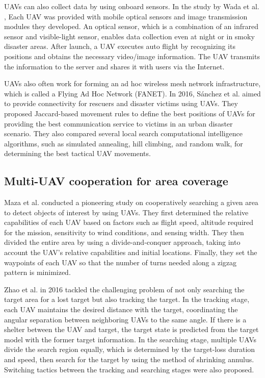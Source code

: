 \documentclass{ieeeaccess}
\begin{document}
UAVs can also collect data by using onboard sensors. In the study by Wada et al. \cite{Wada2015}, Each UAV was provided with mobile optical sensors and image transmission modules they developed. 
An optical sensor, which is a combination of an infrared sensor and visible-light sensor, enables data collection even at night or in smoky disaster areas. 
After launch, a UAV executes auto flight by recognizing its positions and obtains the necessary video/image information. 
The UAV transmits the information to the server and shares it with users via the Internet.

UAVs also often work for forming an ad hoc wireless mesh network infrastructure, which is called a Flying Ad Hoc Network (FANET)\cite{Bekmezci2013}. In 2016, S\'anchez et al. aimed to provide connectivity for rescuers and disaster victims using UAVs\cite{Garcia2016}. They proposed Jaccard-based movement rules to define the best positions of UAVs for providing the best communication service to victims in an urban disaster scenario. They also compared several local search computational intelligence algorithms, such as simulated annealing, hill climbing, and random walk, for determining the best tactical UAV movements.

\subsection{Multi-UAV cooperation for area coverage}\label{cover}
Maza et al. conducted a pioneering study on cooperatively searching a given area to detect objects of interest by using UAVs\cite{Maza2007}. They first determined the relative capabilities of each UAV based on factors such as flight speed, altitude required for the mission, sensitivity to wind conditions, and sensing width. They then divided the entire area by using a divide-and-conquer approach, taking into account the UAV's relative capabilities and initial locations. Finally, they set the waypoints of each UAV so that the number of turns needed along a zigzag pattern is minimized.

Zhao et al. in 2016 tackled the challenging problem of not only searching the target area for a lost target but also tracking the target\cite{chang2016}. In the tracking stage, each UAV maintains the desired distance with the target, coordinating the angular separation between neighboring UAVs to the same angle. If there is a shelter between the UAV and target, the target state is predicted from the target model with the former target information. In the searching stage, multiple UAVs divide the search region equally, which is determined by the target-loss duration and speed, then search for the target by using the method of shrinking annulus. Switching tactics between the tracking and searching stages were also proposed.
\end{document}
